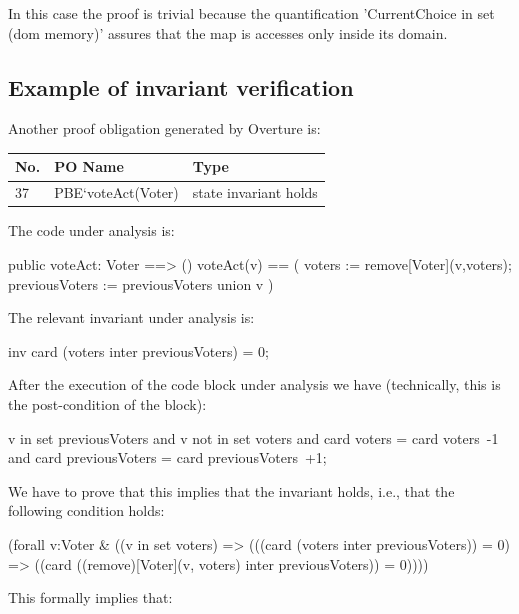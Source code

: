 \documentclass{article}
\begin{document}
In this case the proof is trivial because the quantification 'CurrentChoice in set (dom memory)' assures that the map is accesses only inside its domain.

\subsection{Example of invariant verification}

Another proof obligation generated by Overture is:

\begin{center}
    \begin{tabular}{ | l | l | p{7cm} |}
    \hline
   \textbf{No.}	& \textbf{PO Name} & \textbf{Type} \\ \hline
	37 & PBE`voteAct(Voter) & state invariant holds\\\hline
    \end{tabular}
\end{center}

The code under analysis is:

\begin{vdmpp}
public voteAct: Voter ==> ()
voteAct(v) == (
			voters := remove[Voter](v,voters);
		    previousVoters := previousVoters union {v}
			)
\end{vdmpp}

The relevant invariant under analysis is:

\begin{vdmpp}
inv card (voters inter previousVoters) = 0;
\end{vdmpp}


After the execution of the code block under analysis we have (technically, this is the post-condition of the block):

\begin{vdmpp}
v in set previousVoters
and v not in set voters
and card voters = card voters~-1
and card previousVoters = card previousVoters~+1;
\end{vdmpp}

We have to prove that this implies that the invariant holds, i.e., that the following condition holds:

\begin{vdmpp}
(forall v:Voter & ((v in set voters) => 
(((card (voters inter previousVoters)) = 0) => 
((card ((remove)[Voter](v, voters) inter previousVoters)) = 0))))
\end{vdmpp}

This formally implies that:
\end{document}
